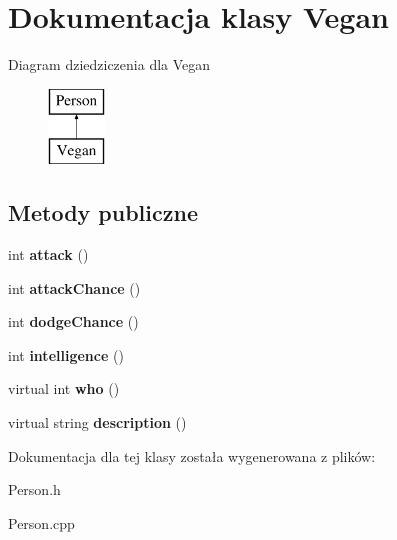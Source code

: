 \hypertarget{classVegan}{}\section{Dokumentacja klasy Vegan}
\label{classVegan}
Diagram dziedziczenia dla Vegan\begin{figure}[H]
\begin{center}
\leavevmode
\includegraphics[height=2.000000cm]{classVegan}
\end{center}
\end{figure}
\subsection*{Metody publiczne}
\begin{DoxyCompactItemize}
\item 
int {\bfseries attack} ()\hypertarget{classVegan_a49da538a7bdc7cf95e2995d374844690}{}\label{classVegan_a49da538a7bdc7cf95e2995d374844690}

\item 
int {\bfseries attack\+Chance} ()\hypertarget{classVegan_add22eca62b8e3c3ffe93da1d0e5d91f5}{}\label{classVegan_add22eca62b8e3c3ffe93da1d0e5d91f5}

\item 
int {\bfseries dodge\+Chance} ()\hypertarget{classVegan_aad321fbb0951c24515900f002ede0286}{}\label{classVegan_aad321fbb0951c24515900f002ede0286}

\item 
int {\bfseries intelligence} ()\hypertarget{classVegan_a2b63e0fcdefc296e4164d4e26fda4aa8}{}\label{classVegan_a2b63e0fcdefc296e4164d4e26fda4aa8}

\item 
virtual int {\bfseries who} ()\hypertarget{classVegan_a46b4008d435a0ab8c0986ceda995d2da}{}\label{classVegan_a46b4008d435a0ab8c0986ceda995d2da}

\item 
virtual string {\bfseries description} ()\hypertarget{classVegan_a021955c46ba7952ab46a07a768f9b3b3}{}\label{classVegan_a021955c46ba7952ab46a07a768f9b3b3}

\end{DoxyCompactItemize}


Dokumentacja dla tej klasy została wygenerowana z plików\+:\begin{DoxyCompactItemize}
\item 
Person.\+h\item 
Person.\+cpp\end{DoxyCompactItemize}

